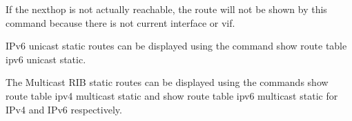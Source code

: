 If the nexthop is not actually reachable, the route will not be shown
by this command because there is not current interface or vif.

\vspace{0.2in}
IPv6 unicast static routes can be displayed using the command {\stt show route
table ipv6 unicast static}.

The Multicast RIB static routes can be displayed using the commands
{\stt show route table ipv4 multicast static} and
{\stt show route table ipv6 multicast static} for IPv4 and IPv6 respectively.
